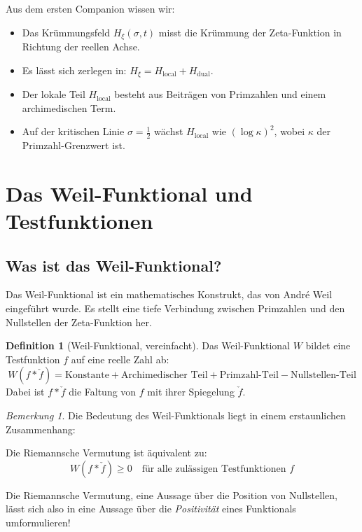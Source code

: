 \documentclass[11pt,a4paper]{article}
\theoremstyle{plain}
\theoremstyle{definition}
\newtheorem{definition}[theorem]{Definition}
\theoremstyle{remark}
\newtheorem{remark}[theorem]{Bemerkung}
\newcommand{\Hxi}{H_{\xi}}
\newcommand{\Hlocal}{H_{\mathrm{local}}}
\newcommand{\Hdual}{H_{\mathrm{dual}}}
\begin{document}
	Aus dem ersten Companion wissen wir:
	\begin{itemize}
		\item Das Kr\"ummungsfeld $\Hxi(\sigma, t)$ misst die Kr\"ummung der
		Zeta-Funktion in Richtung der reellen Achse.
		\item Es l\"asst sich zerlegen in: $\Hxi = \Hlocal + \Hdual$.
		\item Der lokale Teil $\Hlocal$ besteht aus Beitr\"agen von Primzahlen und
		einem archimedischen Term.
		\item Auf der kritischen Linie $\sigma=\frac{1}{2}$ w\"achst $\Hlocal$ wie
		$(\log \kappa)^2$, wobei $\kappa$ der Primzahl-Grenzwert ist.
	\end{itemize}
	
	
	
	\section{Das Weil-Funktional und Testfunktionen}\label{sec:weil_funktional}
	
	\subsection{Was ist das Weil-Funktional?}
	
	Das Weil-Funktional ist ein mathematisches Konstrukt, das von Andr\'e Weil
	eingef\"uhrt wurde. Es stellt eine tiefe Verbindung zwischen Primzahlen und
	den Nullstellen der Zeta-Funktion her.
	
	\begin{definition}[Weil-Funktional, vereinfacht]
		Das Weil-Funktional $W$ bildet eine Testfunktion $f$ auf eine reelle Zahl ab:
		\begin{equation}
			W(f * \check{f}) = \text{Konstante} + \text{Archimedischer Teil}
			+ \text{Primzahl-Teil} - \text{Nullstellen-Teil}
		\end{equation}
		Dabei ist $f * \check{f}$ die Faltung von $f$ mit ihrer Spiegelung $\check{f}$.
	\end{definition}
	
	\begin{remark}
		Die Bedeutung des Weil-Funktionals liegt in einem erstaunlichen Zusammenhang:
		
		Die Riemannsche Vermutung ist \"aquivalent zu:
		\begin{equation}
			W(f * \check{f}) \geq 0 \quad \text{f\"ur alle zul\"assigen Testfunktionen } f
		\end{equation}
		
		Die Riemannsche Vermutung, eine Aussage \"uber die Position von Nullstellen,
		l\"asst sich also in eine Aussage \"uber die \emph{Positivit\"at} eines
		Funktionals umformulieren!
	\end{remark}
	
\end{document}
